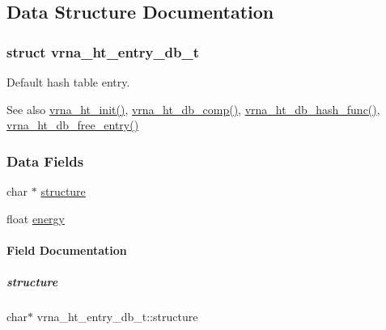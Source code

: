 \subsection{Data Structure Documentation}
\label{structvrna__ht__entry__db__t}
\subsubsection{struct vrna\+\_\+ht\+\_\+entry\+\_\+db\+\_\+t}
Default hash table entry. 

\begin{DoxySeeAlso}{See also}
\hyperlink{group__hash__table__utils_ga37d1c7e13087a2b7c1b87fda34577c29}{vrna\+\_\+ht\+\_\+init()}, \hyperlink{group__hash__table__utils_gac4ec0b8372d50d7347a63f140f340962}{vrna\+\_\+ht\+\_\+db\+\_\+comp()}, \hyperlink{group__hash__table__utils_gad133721a3cd2f8ca259fe315d86035a7}{vrna\+\_\+ht\+\_\+db\+\_\+hash\+\_\+func()}, \hyperlink{group__hash__table__utils_gabcdcd0d070b3dfd2634a09e7838acf66}{vrna\+\_\+ht\+\_\+db\+\_\+free\+\_\+entry()} 
\end{DoxySeeAlso}
\subsubsection*{Data Fields}
\begin{DoxyCompactItemize}
\item 
char $\ast$ \hyperlink{group__hash__table__utils_a094ce43244eced065ea0e5fa50287a25}{structure}
\item 
float \hyperlink{group__hash__table__utils_afffab6040a5cfc3ac465d94d8538d88a}{energy}
\end{DoxyCompactItemize}


\paragraph{Field Documentation}
\mbox{\label{group__hash__table__utils_a094ce43244eced065ea0e5fa50287a25}} 
\subparagraph{\texorpdfstring{structure}{structure}}
{\footnotesize\ttfamily char$\ast$ vrna\+\_\+ht\+\_\+entry\+\_\+db\+\_\+t\+::structure}

